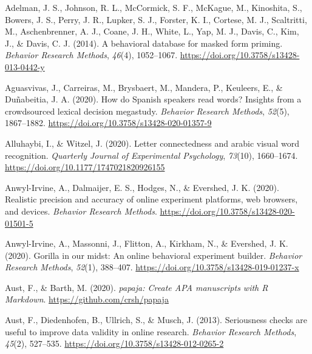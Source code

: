 \documentclass[
  english,
  man,floatsintext]{apa6}
\newlength{\cslhangindent}
\newlength{\cslentryspacingunit} %
\newenvironment{CSLReferences}[2] %
 {%
  \setlength{\parindent}{0pt}
  \ifodd #1
  \let\oldpar\par
  \def\par{\hangindent=\cslhangindent\oldpar}
  \fi
  \setlength{\parskip}{#2\cslentryspacingunit}
 }%
 {}
\begin{document}
\hypertarget{refs}{}
\begin{CSLReferences}{1}{0}
\leavevmode{}%
Adelman, J. S., Johnson, R. L., McCormick, S. F., McKague, M., Kinoshita, S., Bowers, J. S., Perry, J. R., Lupker, S. J., Forster, K. I., Cortese, M. J., Scaltritti, M., Aschenbrenner, A. J., Coane, J. H., White, L., Yap, M. J., Davis, C., Kim, J., \& Davis, C. J. (2014). A behavioral database for masked form priming. \emph{Behavior Research Methods}, \emph{46}(4), 1052--1067. \url{https://doi.org/10.3758/s13428-013-0442-y}

\leavevmode{}%
Aguasvivas, J., Carreiras, M., Brysbaert, M., Mandera, P., Keuleers, E., \& Duñabeitia, J. A. (2020). How do Spanish speakers read words? Insights from a crowdsourced lexical decision megastudy. \emph{Behavior Research Methods}, \emph{52}(5), 1867--1882. \url{https://doi.org/10.3758/s13428-020-01357-9}

\leavevmode{}%
Alluhaybi, I., \& Witzel, J. (2020). Letter connectedness and arabic visual word recognition. \emph{Quarterly Journal of Experimental Psychology}, \emph{73}(10), 1660--1674. \url{https://doi.org/10.1177/1747021820926155}

\leavevmode{}%
Anwyl-Irvine, A., Dalmaijer, E. S., Hodges, N., \& Evershed, J. K. (2020). Realistic precision and accuracy of online experiment platforms, web browsers, and devices. \emph{Behavior Research Methods}. \url{https://doi.org/10.3758/s13428-020-01501-5}

\leavevmode{}%
Anwyl-Irvine, A., Massonni, J., Flitton, A., Kirkham, N., \& Evershed, J. K. (2020). Gorilla in our midst: An online behavioral experiment builder. \emph{Behavior Research Methods}, \emph{52}(1), 388--407. \url{https://doi.org/10.3758/s13428-019-01237-x}

\leavevmode{}%
Aust, F., \& Barth, M. (2020). \emph{{papaja}: {Create} {APA} manuscripts with {R Markdown}}. \url{https://github.com/crsh/papaja}

\leavevmode{}%
Aust, F., Diedenhofen, B., Ullrich, S., \& Musch, J. (2013). Seriousness checks are useful to improve data validity in online research. \emph{Behavior Research Methods}, \emph{45}(2), 527--535. \url{https://doi.org/10.3758/s13428-012-0265-2}


\end{CSLReferences}
\end{document}
